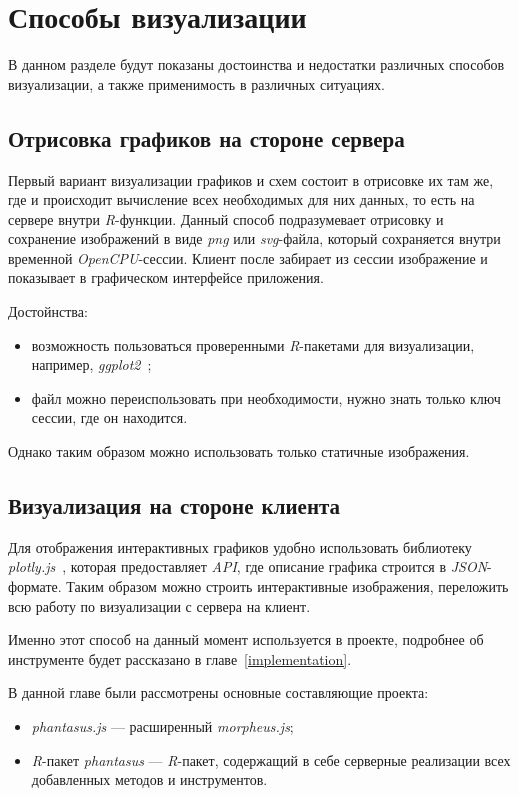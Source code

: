 \section{Способы визуализации}
В данном разделе будут показаны достоинства и недостатки различных способов визуализации, а также применимость в различных ситуациях. 
\subsection{Отрисовка графиков на стороне сервера}
Первый вариант визуализации графиков и схем состоит в отрисовке их там же, где и происходит вычисление всех необходимых для них данных, то есть на сервере внутри \emph{R}-функции. Данный способ подразумевает отрисовку и сохранение изображений в виде \emph{png} или \emph{svg}-файла, который сохраняется внутри временной \emph{OpenCPU}-сессии. Клиент после забирает из сессии изображение и показывает в графическом интерфейсе приложения.

Достойнства:\begin{itemize}
\item возможность пользоваться проверенными \emph{R}-пакетами для визуализации, например, \emph{ggplot2}~\cite{ggplot2};
\item файл можно переиспользовать при необходимости, нужно знать только ключ сессии, где он находится.
\end{itemize}

Однако таким образом можно использовать только статичные изображения.

\subsection{Визуализация на стороне клиента}
Для отображения интерактивных графиков удобно использовать библиотеку \emph{plotly.js}~\cite{plotly}, которая предоставляет \emph{API}, где описание графика строится в \emph{JSON}-формате.
Таким образом можно строить интерактивные изображения, переложить всю работу по визуализации с сервера на клиент.

Именно этот способ на данный момент используется в проекте, подробнее об инструменте будет рассказано в главе~\ref{implementation}.

\chapterconclusion
В данной главе были рассмотрены основные составляющие проекта:
\begin{itemize}
\item \emph{phantasus.js} --- расширенный \emph{morpheus.js};
\item \emph{R}-пакет \emph{phantasus} --- \emph{R}-пакет, содержащий в себе серверные реализации всех добавленных методов и инструментов.
\end{itemize}

